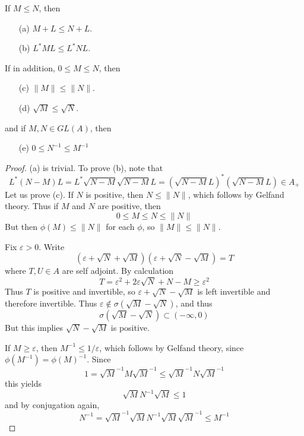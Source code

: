 \begin{prop}
    If $M \leq N$, then
    \begin{enumerate}
        \item[(a)] $M + L \leq N + L$.
        \item[(b)] $L^*ML \leq L^*NL$.
    \end{enumerate}
    If in addition, $0 \leq M \leq N$, then
    \begin{enumerate}
        \item[(c)] $\| M \| \leq \| N \|$.
        \item[(d)] $\sqrt{M} \leq \sqrt{N}$.
    \end{enumerate}
    and if $M, N \in GL(A)$, then
    \begin{enumerate}
        \item[(e)] $0 \leq N^{-1} \leq M^{-1}$
    \end{enumerate}
\end{prop}
\begin{proof}
    (a) is trivial. To prove (b), note that
    \[ L^*(N - M)L = L^*\sqrt{N - M}\sqrt{N - M}L = (\sqrt{N - M} L)^* (\sqrt{N - M} L) \in A_+ \]
    Let us prove (c). If $N$ is positive, then $N \leq \| N \|$, which follows by Gelfand theory. Thus if $M$ and $N$ are positive, then
    \[ 0 \leq M \leq N \leq \| N \| \]
    But then $\phi(M) \leq \| N \|$ for each $\phi$, so $\| M \| \leq \| N \|$.

    Fix $\varepsilon > 0$. Write
    \[ (\varepsilon + \sqrt{N} + \sqrt{M})(\varepsilon + \sqrt{N} - \sqrt{M}) = T \]
    where $T,U \in A$ are self adjoint. By calculation
    \[ T = \varepsilon^2 + 2 \varepsilon \sqrt{N} + N - M \geq \varepsilon^2 \]
    Thus $T$ is positive and invertible, so $\varepsilon + \sqrt{N} - \sqrt{M}$ is left invertible and therefore invertible. Thus $\varepsilon \not \in \sigma(\sqrt{M} - \sqrt{N})$, and thus
    \[ \sigma(\sqrt{M} - \sqrt{N}) \subset (-\infty, 0) \]
    But this implies $\sqrt{N} - \sqrt{M}$ is positive.

    If $M \geq \varepsilon$, then $M^{-1} \leq 1/\varepsilon$, which follows by Gelfand theory, since $\phi(M^{-1}) = \phi(M)^{-1}$. Since
    \[ 1 = \sqrt{M}^{-1}M\sqrt{M}^{-1} \leq \sqrt{M}^{-1} N \sqrt{M}^{-1} \]
    this yields
    \[ \sqrt{M} N^{-1} \sqrt{M} \leq 1 \]
    and by conjugation again,
    \[ N^{-1} = \sqrt{M}^{-1} \sqrt{M} N^{-1} \sqrt{M} \sqrt{M}^{-1} \leq M^{-1} \]
\end{proof}

